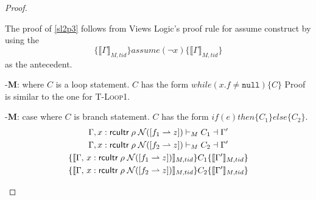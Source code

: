 \begin{proof}
\begin{case}
    The proof of \ref{sl2p3} follows from Views Logic's proof rule for assume construct by using the
    \[ \{ \llbracket \Gamma \rrbracket_{M,tid} \}assume\left(\lnot x\right)\{ \llbracket \Gamma \rrbracket_{M,tid} \}\] as the antecedent.
  \end{case}
  \begin{case}-\textbf{M}: where $C$ is a loop statement. $C$ has the form $while(x.f\neq \texttt{null})\{C\}$
    Proof is similar to the one for \textsc{T-Loop1}. 
  \end{case}
  \begin{case}-\textbf{M}: case where $C$ is branch statement. $C$ has the form $if\left(e\right)then\{C_1\}else\{C_2\}$.
      \begin{gather}\label{sl4a1}
       \Gamma, x:\textsf{rcuItr}\;\rho\;\mathcal{N}([f_1 \rightharpoonup z]) \vdash_{M} C_1 \dashv \Gamma' \\
       \label{sl4a2}
       \Gamma, x:\textsf{rcuItr}\;\rho\;\mathcal{N}([f_2 \rightharpoonup z]) \vdash_{M} C_2 \dashv \Gamma' \\
       \label{sl4a4}
       \{\llbracket \Gamma, \,  x:\textsf{rcuItr}\;\rho\;\mathcal{N}([f_1 \rightharpoonup z]) \rrbracket_{M,tid} \}  C_1  \{\llbracket \Gamma' \rrbracket_{M,tid}\}\\
        \label{sl4a5}
       \{\llbracket \Gamma , \, x:\textsf{rcuItr}\;\rho\;\mathcal{N}([f_2 \rightharpoonup z]) \rrbracket_{M,tid} \}  C_2  \{\llbracket \Gamma' \rrbracket_{M,tid}\}
      \end{gather}
      

\end{case}
\end{proof}

